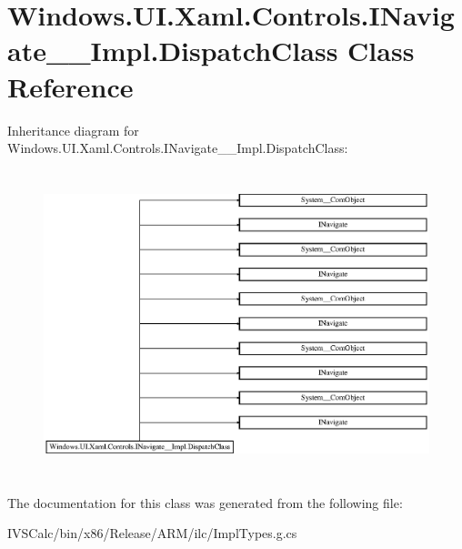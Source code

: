 \hypertarget{class_windows_1_1_u_i_1_1_xaml_1_1_controls_1_1_i_navigate_____impl_1_1_dispatch_class}{}\section{Windows.\+U\+I.\+Xaml.\+Controls.\+I\+Navigate\+\_\+\+\_\+\+Impl.\+Dispatch\+Class Class Reference}
\label{class_windows_1_1_u_i_1_1_xaml_1_1_controls_1_1_i_navigate_____impl_1_1_dispatch_class}
Inheritance diagram for Windows.\+U\+I.\+Xaml.\+Controls.\+I\+Navigate\+\_\+\+\_\+\+Impl.\+Dispatch\+Class\+:\begin{figure}[H]
\begin{center}
\leavevmode
\includegraphics[height=8.927536cm]{class_windows_1_1_u_i_1_1_xaml_1_1_controls_1_1_i_navigate_____impl_1_1_dispatch_class}
\end{center}
\end{figure}


The documentation for this class was generated from the following file\+:\begin{DoxyCompactItemize}
\item 
I\+V\+S\+Calc/bin/x86/\+Release/\+A\+R\+M/ilc/Impl\+Types.\+g.\+cs\end{DoxyCompactItemize}
